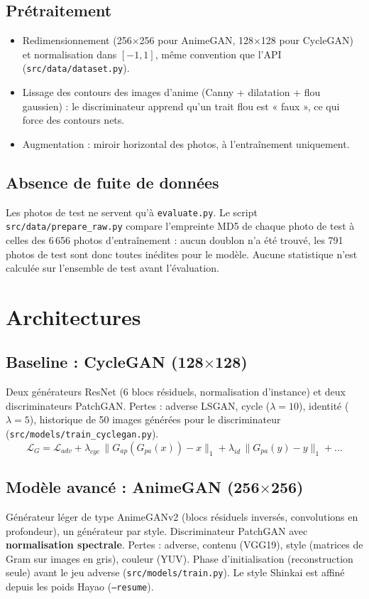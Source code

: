 \documentclass[11pt,a4paper]{article}
\begin{document}
\subsection{Prétraitement}
\begin{itemize}
  \item Redimensionnement (256$\times$256 pour AnimeGAN, 128$\times$128 pour CycleGAN) et
        normalisation dans $[-1,1]$, même convention que l'API (\texttt{src/data/dataset.py}).
  \item Lissage des contours des images d'anime (Canny + dilatation + flou gaussien) : le
        discriminateur apprend qu'un trait flou est « faux », ce qui force des contours nets.
  \item Augmentation : miroir horizontal des photos, à l'entraînement uniquement.
\end{itemize}

\subsection{Absence de fuite de données}
Les photos de test ne servent qu'à \texttt{evaluate.py}. Le script \texttt{src/data/prepare\_raw.py} compare l'empreinte MD5 de chaque photo de
test à celles des 6\,656 photos d'entraînement : aucun doublon n'a été trouvé, les 791 photos
de test sont donc toutes inédites pour le modèle.
Aucune statistique n'est calculée sur l'ensemble de test avant l'évaluation.

\section{Architectures}

\subsection{Baseline : CycleGAN (128$\times$128)}
Deux générateurs ResNet (6 blocs résiduels, normalisation d'instance) et deux discriminateurs
PatchGAN. Pertes : adverse LSGAN, cycle ($\lambda=10$), identité ($\lambda=5$), historique de
50 images générées pour le discriminateur (\texttt{src/models/train\_cyclegan.py}).
\[
\mathcal{L}_G = \mathcal{L}_{adv} + \lambda_{cyc}\,\lVert G_{ap}(G_{pa}(x)) - x\rVert_1
  + \lambda_{id}\,\lVert G_{pa}(y) - y\rVert_1 + \dots
\]

\subsection{Modèle avancé : AnimeGAN (256$\times$256)}
Générateur léger de type AnimeGANv2 (blocs résiduels inversés, convolutions en profondeur),
un générateur par style. Discriminateur PatchGAN avec \textbf{normalisation spectrale}.
Pertes : adverse, contenu (VGG19), style (matrices de Gram sur images en gris), couleur (YUV).
Phase d'initialisation (reconstruction seule) avant le jeu adverse
(\texttt{src/models/train.py}). Le style Shinkai est affiné depuis les poids Hayao
(\texttt{--resume}).
\end{document}
